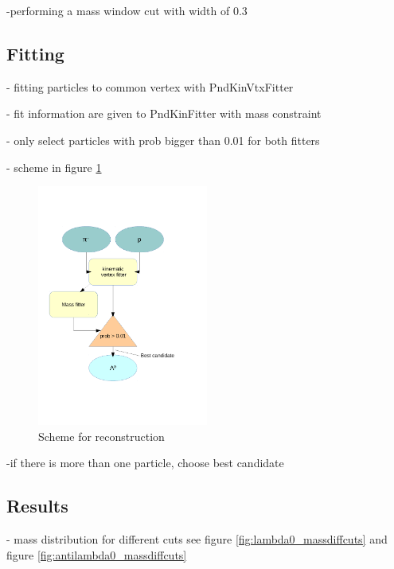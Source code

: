 		-performing a mass window cut with width of $0.3$\massunit 
		
		
	\subsection{Fitting}
	
		- fitting particles to common vertex with PndKinVtxFitter
		
		- fit information are given to PndKinFitter with mass constraint
		
		- only select particles with prob bigger than 0.01 for both fitters
		
		- scheme in figure \ref{fig:lambda_scheme}
		
		\begin{figure}
			\centering
				\includegraphics[width=0.50\textwidth]{./plots/combineLambda0.pdf}
			\caption{Scheme for \lam reconstruction}
			\label{fig:lambda_scheme}
		\end{figure}
		
		-if there is more than one particle, choose best candidate
		
	\subsection{Results}
	
		- mass distribution for different cuts see figure \ref{fig:lambda0_massdiffcuts} and figure \ref{fig:antilambda0_massdiffcuts}
		
